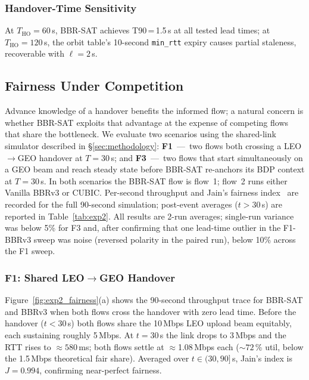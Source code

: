 \documentclass[conference]{IEEEtran}
\begin{document}
\subsubsection{Handover-Time Sensitivity}

At $T_\mathrm{HO} = 60$\,s, BBR-SAT achieves T90\,=\,1.5\,s at all tested lead times; at $T_\mathrm{HO} = 120$\,s, the orbit table's 10-second \texttt{min\_rtt} expiry causes partial staleness, recoverable with $\ell = 2$\,s.

\subsection{Fairness Under Competition}
\label{sec:fairness}

Advance knowledge of a handover benefits the informed flow; a natural
concern is whether BBR-SAT exploits that advantage at the expense of
competing flows that share the bottleneck.
We evaluate two scenarios using the shared-link simulator described in
\S\ref{sec:methodology}:
\textbf{F1}~---~two flows both crossing a LEO$\to$GEO handover at $T=30$\,s;
and \textbf{F3}~---~two flows that start simultaneously on a GEO beam and
reach steady state before BBR-SAT re-anchors its BDP context at $T=30$\,s.
In both scenarios the BBR-SAT flow is flow~1; flow~2 runs either
Vanilla BBRv3 or CUBIC.
Per-second throughput and Jain's fairness index~\cite{jain1984} are
recorded for the full 90-second simulation; post-event averages
($t > 30$\,s) are reported in Table~\ref{tab:exp2}.
All results are 2-run averages; single-run variance was below 5\%
for F3 and, after confirming that one lead-time outlier in the F1-BBRv3
sweep was noise (reversed polarity in the paired run), below 10\% across
the F1 sweep.

\subsubsection{F1: Shared LEO$\to$GEO Handover}

Figure~\ref{fig:exp2_fairness}(a) shows the 90-second throughput trace for
BBR-SAT and BBRv3 when both flows cross the handover with zero lead time.
Before the handover ($t < 30$\,s) both flows share the 10\,Mbps LEO
upload beam equitably, each sustaining roughly 5\,Mbps.
At $t = 30$\,s the link drops to 3\,Mbps and the RTT rises to
$\approx580$\,ms; both flows settle at $\approx$1.08\,Mbps each
(${\sim}72$\,\% util, below the 1.5\,Mbps theoretical fair share).
Averaged over $t \in (30, 90]$\,s, Jain's index is $J = 0.994$,
confirming near-perfect fairness.
\end{document}
